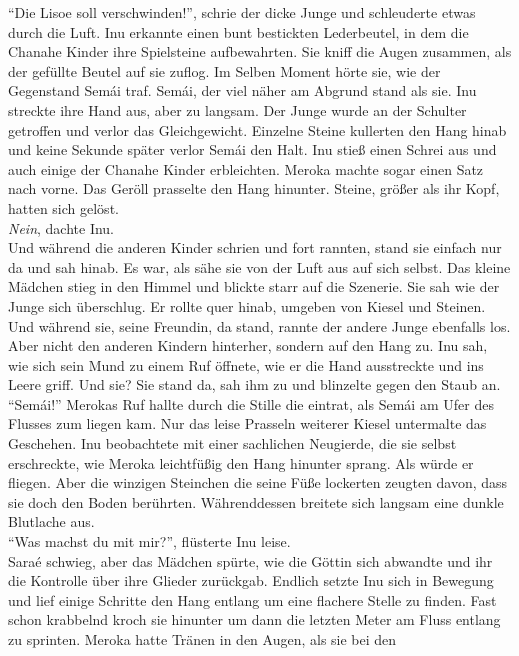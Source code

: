 ``Die Lisoe soll verschwinden!'', schrie der dicke Junge und schleuderte etwas durch die Luft. Inu 
erkannte einen bunt bestickten Lederbeutel, in dem die Chanahe Kinder ihre Spielsteine 
aufbewahrten. Sie kniff die Augen zusammen, als der gefüllte Beutel auf sie zuflog. Im Selben 
Moment hörte sie, wie der Gegenstand Semái traf. Semái, der viel näher am Abgrund stand als sie. 
Inu streckte ihre Hand aus, aber zu langsam. Der Junge wurde an der Schulter getroffen und verlor 
das Gleichgewicht. Einzelne Steine kullerten den Hang hinab und keine Sekunde später  verlor Semái 
den Halt. Inu stieß einen Schrei aus und auch einige der Chanahe Kinder erbleichten. Meroka machte 
sogar einen Satz nach vorne.  Das Geröll prasselte den Hang hinunter. Steine, größer als ihr Kopf, 
hatten sich gelöst.\\
\textit{Nein}, dachte Inu.\\
Und während die anderen Kinder schrien und fort rannten, stand sie einfach nur da und sah hinab. Es 
war, als sähe sie von der Luft aus auf sich selbst. Das kleine Mädchen stieg in den Himmel und 
blickte starr auf die Szenerie. Sie sah wie der Junge sich überschlug. Er rollte quer hinab, 
umgeben von Kiesel und Steinen. Und während sie, seine Freundin, da stand, rannte der andere Junge 
ebenfalls los. Aber nicht den anderen Kindern hinterher, sondern auf den Hang zu. Inu sah, wie sich 
sein Mund zu einem Ruf öffnete, wie er die Hand ausstreckte und ins Leere griff. Und sie? Sie stand 
da, sah ihm zu und blinzelte gegen den Staub an. \\
``Semái!'' Merokas Ruf hallte durch die Stille die eintrat, als Semái am Ufer des Flusses zum 
liegen kam. Nur das leise Prasseln weiterer Kiesel untermalte das Geschehen. Inu beobachtete mit 
einer sachlichen Neugierde, die sie selbst erschreckte, wie Meroka leichtfüßig den Hang hinunter 
sprang. Als würde er fliegen. Aber die winzigen Steinchen die seine Füße lockerten zeugten davon, 
dass sie doch den Boden berührten. Währenddessen breitete sich langsam eine dunkle Blutlache aus. \\
``Was machst du mit mir?'', flüsterte Inu leise.\\
Saraé schwieg, aber das Mädchen spürte, wie die Göttin sich abwandte und ihr die Kontrolle über 
ihre Glieder zurückgab. Endlich setzte Inu sich in Bewegung und lief einige Schritte den Hang 
entlang um eine flachere Stelle zu finden. Fast schon krabbelnd kroch sie hinunter um dann die 
letzten Meter am Fluss entlang zu sprinten. Meroka hatte Tränen in den Augen, als sie bei den 
